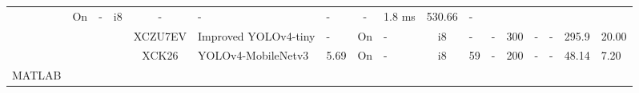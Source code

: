 \begin{table}
\begin{adjustbox}{totalheight=\baselineskip,}
\begin{tabular}{ccccclp{2em}cp{3em}cp{2em}p{4em}p{3em}p{3.5em}p{3.5em}p{2.5em}p{3em}}
                           &\multirow{1}{*}{On}
                               &\multirow{1}{*}{-}
                                   &\multirow{1}{*}{i8}
                                       &\multirow{1}{*}{-}
                                           &\multirow{1}{*}{-}
                                               &\multirow{1}{*}{-}
                                                   &\multirow{1}{*}{-}
                                                       &\multirow{1}{*}{1.8 ms}
                                                           &\multirow{1}{*}{530.66}
                                                               &\multirow{1}{*}{-}\\
\cmidrule{4-17}
   &   &   &\multirow{1}{*}{\cite{yuImprovedLightweightDeep2024}}
               &\multirow{1}{*}{XCZU7EV}
                   &\multirow{1}{*}{Improved YOLOv4-tiny}
                       &\multirow{1}{*}{-}
                           &\multirow{1}{*}{On}
                               &\multirow{1}{*}{-}
                                   &\multirow{1}{*}{i8}
                                       &\multirow{1}{*}{-}
                                           &\multirow{1}{*}{-}
                                               &\multirow{1}{*}{300}
                                                   &\multirow{1}{*}{-}
                                                       &\multirow{1}{*}{-}
                                                           &\multirow{1}{*}{295.9}
                                                               &\multirow{1}{*}{20.00}\\
\cmidrule{4-17}
   &   &   &\multirow{1}{*}{\cite{zhaoHardwareAccelerationSatellite2023a}}
               &\multirow{1}{*}{XCK26}
                   &\multirow{1}{*}{YOLOv4-MobileNetv3}
                       &\multirow{1}{*}{5.69}
                           &\multirow{1}{*}{On}
                               &\multirow{1}{*}{-}
                                   &\multirow{1}{*}{i8}
                                       &\multirow{1}{*}{59}
                                           &\multirow{1}{*}{-}
                                               &\multirow{1}{*}{200}
                                                   &\multirow{1}{*}{-}
                                                       &\multirow{1}{*}{-}
                                                           &\multirow{1}{*}{48.14}
                                                               &\multirow{1}{*}{7.20}\\
\cmidrule{1-17}
\multirow{4}{*}{MATLAB}

\end{tabular}
\end{adjustbox}
\end{table}
